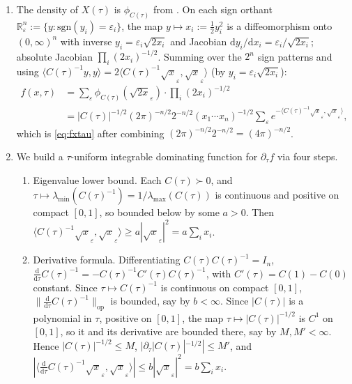\documentclass[14pt]{extarticle}
\makeatletter
\theoremstyle{definition}
\renewenvironment{proof}[1][\proofname]{\par
  \pushQED{\qed}%
  \normalfont \topsep6\p@\@plus6\p@\relax
  \trivlist
  \item[\hskip\labelsep\bfseries #1\@addpunct{.}]\ignorespaces
}{%
  \popQED\endtrivlist\@endpefalse
}
\newcommand{\R}{\mathbb{R}}
\newcommand{\dd}{\mathrm{d}}
\makeatother
\begin{document}
\begin{proof}
  \leavevmode
  \begin{enumerate}[label=(\roman*)]
    \item The density of $X(\tau)$ is $\phi_{C(\tau)}$ from
      .  On each sign orthant
      $\R^n_\varepsilon:=\{y:\text{sgn}(y_i)=\varepsilon_i\}$, the map
      $y\mapsto x_i:=\tfrac12 y_i^2$ is a diffeomorphism onto
      $(0,\infty)^n$ with inverse $y_i=\varepsilon_i\sqrt{2x_i}$ and
      Jacobian $\dd y_i/\dd x_i=\varepsilon_i/\sqrt{2x_i}$; absolute
      Jacobian $\prod_i(2x_i)^{-1/2}$.  Summing over the $2^n$ sign
      patterns and using
      $\langle C(\tau)^{-1}y,y\rangle
      =2\langle C(\tau)^{-1}\sqrt{x}_\varepsilon,\sqrt{x}_\varepsilon\rangle$
      (by $y_i=\varepsilon_i\sqrt{2x_i}$):
      \begin{align*}
        f(x,\tau)
        &=\sum_\varepsilon\phi_{C(\tau)}(\sqrt{2x}_\varepsilon)
          \cdot\prod_i(2x_i)^{-1/2}\\
        &=|C(\tau)|^{-1/2}(2\pi)^{-n/2}2^{-n/2}(x_1\cdots x_n)^{-1/2}
          \sum_\varepsilon e^{-\langle C(\tau)^{-1}\sqrt{x}_\varepsilon,
          \sqrt{x}_\varepsilon\rangle},
      \end{align*}
      which is \eqref{eq:fxtau} after combining
      $(2\pi)^{-n/2}2^{-n/2}=(4\pi)^{-n/2}$.

    \item We build a $\tau$-uniform integrable dominating function for
      $\partial_\tau f$ via four steps.
      \begin{enumerate}
        \item Eigenvalue lower bound.  Each $C(\tau)\succ 0$, and
          $\tau\mapsto\lambda_{\min}(C(\tau)^{-1})=1/\lambda_{\max}(C(\tau))$
          is continuous and positive on compact $[0,1]$, so bounded
          below by some $a>0$.  Then
          $\langle C(\tau)^{-1}\sqrt{x}_\varepsilon,\sqrt{x}_\varepsilon\rangle
          \geqslant a|\sqrt{x}_\varepsilon|^2=a\sum_ix_i$.

        \item Derivative formula.  Differentiating
          $C(\tau)C(\tau)^{-1}=I_n$,
          $\tfrac{\dd}{\dd\tau}C(\tau)^{-1}=-C(\tau)^{-1}C'(\tau)C(\tau)^{-1}$,
          with $C'(\tau)=C(1)-C(0)$ constant.  Since
          $\tau\mapsto C(\tau)^{-1}$ is continuous on compact $[0,1]$,
          $\|\tfrac{\dd}{\dd\tau}C(\tau)^{-1}\|_{\mathrm{op}}$ is
          bounded, say by $b<\infty$.  Since $|C(\tau)|$ is a polynomial
          in $\tau$, positive on $[0,1]$, the map
          $\tau\mapsto|C(\tau)|^{-1/2}$ is $C^1$ on $[0,1]$, so it and
          its derivative are bounded there, say by $M,M'<\infty$.  Hence
          $|C(\tau)|^{-1/2}\leqslant M$,
          $|\partial_\tau|C(\tau)|^{-1/2}|\leqslant M'$, and
          $|\langle\tfrac{\dd}{\dd\tau}C(\tau)^{-1}\sqrt{x}_\varepsilon,
          \sqrt{x}_\varepsilon\rangle|\leqslant b|\sqrt{x}_\varepsilon|^2
          =b\sum_ix_i$.


\end{enumerate}
\end{enumerate}
\end{proof}
\end{document}
